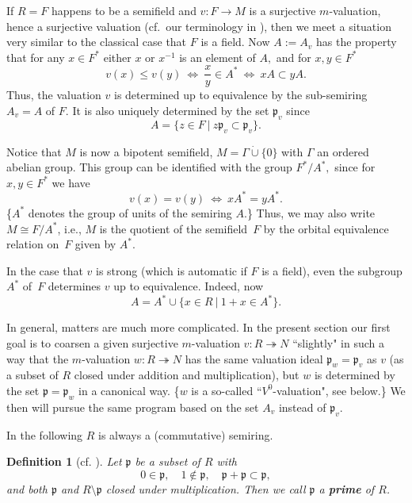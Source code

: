 \documentclass [12pt,a4paper,reqno]{amsart}
\newtheorem{defn}[thm]{Definition}
\begin{document}
If $R=F$ happens to be a semifield and $v: F\to M$ is a surjective
$m$-valuation, hence a surjective valuation (cf.~our terminology
in \cite[\S2]{IKR1}), then we meet a situation very similar to the
classical case that $F$ is a field. Now $A:=A_v$ has the property
that for any $x\in F^*$ either $x$ or $x^{-1}$ is an element of
$A,$ and for $x,y\in F^*$
$$v(x)\le v(y) \ \Leftrightarrow \ \frac{x}{y}\in A^* \ \Leftrightarrow \ xA
\subset yA.$$ Thus, the valuation $v$ is determined up to
equivalence by the sub-semiring $A_v=A$ of $F.$ It is also
uniquely determined by the set ${\mathfrak p} _v$ since
$$A =\{z\in F {\ {|} \ }z{\mathfrak p} _v\subset {\mathfrak p} _v\}.$$

Notice that $M$ is now a bipotent semifield,
$M=\Gamma\dot\cup\{0\}$ with $\Gamma$ an ordered abelian group.
This group can be identified with the group $F^*/A^*,$ since for
$x,y\in F^*$ we have
$$v(x)=v(y)\ \Leftrightarrow \ xA^*=yA^*.$$
\{$A^*$ denotes the group of units of the semiring $A.$\} Thus, we
may also write $M\cong F/A^*$, i.e., $M$ is the quotient of the
semifield~$F$ by the orbital equivalence relation on~$F$ given by
$A^*.$

In the case that $v$ is strong (which is automatic if $F$ is a
field), even the subgroup $A^*$ of~$F$ determines $v$ up to
equivalence. Indeed, now
$$A=A^*\cup\{x\in R {\ {|} \ }1+x\in A^*\}.$$

In general,  matters are much more complicated. In the present
section our first goal is to coarsen a given surjective
$m$-valuation $v: R\twoheadrightarrow N$ ``slightly" in such a way
that the
 $m$-valuation $w:
R\twoheadrightarrow N$ has the same valuation ideal ${\mathfrak p}_w={\mathfrak p}
_v$ as $v$ (as a subset of $R$ closed under addition and
multiplication), but $w$ is determined by the set ${\mathfrak p}={\mathfrak p} _w$
in a canonical way. \{$w$ is a so-called ``${V^0}$-valuation", see
below.\} We then will pursue the same program based on the set
$A_v$ instead of ${\mathfrak p} _v.$

\vskip 10pt

 In the following $R$
is always a (commutative) semiring.

\begin{defn}[cf. {\cite[\S 1]{C}}]\label{defn1.2}
Let ${\mathfrak p}$ be a subset of $R$ with $$0\in {\mathfrak p}, \quad 1\notin
{\mathfrak p}, \quad {\mathfrak p}+{\mathfrak p} \subset {\mathfrak p},$$ and both ${\mathfrak p}$ and $R
\setminus {\mathfrak p}$ closed under multiplication. Then we call ${\mathfrak p}$ a
{\textbf{{prime}}} of $R$.
\end{defn}
\end{document}
